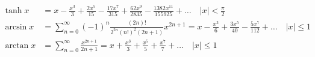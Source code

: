 \documentclass[]{article}
\newcommand{\abs}[1]{\left|#1\right|}
\begin{document}
\begin{align*}
            \tanh{x} &= x - \frac{x^3}{3} + \frac{2x^5}{15} - \frac{17x^7}{315} + \frac{62x^9}{2835} - \frac{1382x^{11}}{155925} + \ldots \quad \abs{x} < \frac{\pi}{2} \\
            \arcsin{x} &= \sum_{n = 0}^{\infty} \left(-1\right)^n \frac{\left(2n\right)!}{2^{2n} \left(n!\right)^2 \left(2n + 1\right)}x^{2n + 1} = x - \frac{x^3}{6} + \frac{3x^5}{40} - \frac{5x^7}{112} + \ldots \quad \abs{x} \le 1 \\
            \arctan{x} &= \sum_{n = 0}^{\infty} \frac{x^{2n + 1}}{2n + 1} = x + \frac{x^3}{3} + \frac{x^5}{5} + \frac{x^7}{7} + \ldots \quad \abs{x} \le 1 \\
        \end{align*}
\end{document}
